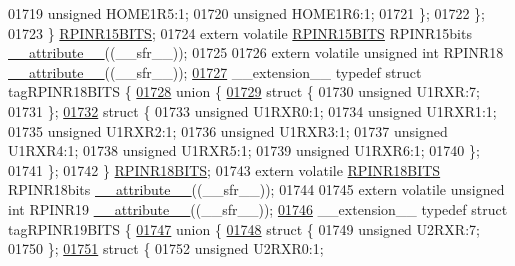 \begin{DoxyCode}
01719       \textcolor{keywordtype}{unsigned} HOME1R5:1;
01720       \textcolor{keywordtype}{unsigned} HOME1R6:1;
01721     \};
01722   \};
01723 \} \hyperlink{a00008_d0/d15/a00700}{RPINR15BITS};
01724 \textcolor{keyword}{extern} \textcolor{keyword}{volatile} \hyperlink{a00008_d0/d15/a00700}{RPINR15BITS} RPINR15bits \hyperlink{a00009_a493c46f03454991ccc5aa7a6e1dfb2a7}{\_\_attribute\_\_}((\_\_sfr\_\_));
01725 
01726 \textcolor{keyword}{extern} \textcolor{keyword}{volatile} \textcolor{keywordtype}{unsigned} \textcolor{keywordtype}{int}  RPINR18 \hyperlink{a00009_a493c46f03454991ccc5aa7a6e1dfb2a7}{\_\_attribute\_\_}((\_\_sfr\_\_));
\hypertarget{a00009_source_l01727}{}\hyperlink{a00008}{01727} \_\_extension\_\_ \textcolor{keyword}{typedef} \textcolor{keyword}{struct }tagRPINR18BITS \{
\hypertarget{a00009_source_l01728}{}\hyperlink{a00009}{01728}   \textcolor{keyword}{union }\{
\hypertarget{a00009_source_l01729}{}\hyperlink{a00009}{01729}     \textcolor{keyword}{struct }\{
01730       \textcolor{keywordtype}{unsigned} U1RXR:7;
01731     \};
\hypertarget{a00009_source_l01732}{}\hyperlink{a00009}{01732}     \textcolor{keyword}{struct }\{
01733       \textcolor{keywordtype}{unsigned} U1RXR0:1;
01734       \textcolor{keywordtype}{unsigned} U1RXR1:1;
01735       \textcolor{keywordtype}{unsigned} U1RXR2:1;
01736       \textcolor{keywordtype}{unsigned} U1RXR3:1;
01737       \textcolor{keywordtype}{unsigned} U1RXR4:1;
01738       \textcolor{keywordtype}{unsigned} U1RXR5:1;
01739       \textcolor{keywordtype}{unsigned} U1RXR6:1;
01740     \};
01741   \};
01742 \} \hyperlink{a00008_d8/d86/a00703}{RPINR18BITS};
01743 \textcolor{keyword}{extern} \textcolor{keyword}{volatile} \hyperlink{a00008_d8/d86/a00703}{RPINR18BITS} RPINR18bits \hyperlink{a00009_a493c46f03454991ccc5aa7a6e1dfb2a7}{\_\_attribute\_\_}((\_\_sfr\_\_));
01744 
01745 \textcolor{keyword}{extern} \textcolor{keyword}{volatile} \textcolor{keywordtype}{unsigned} \textcolor{keywordtype}{int}  RPINR19 \hyperlink{a00009_a493c46f03454991ccc5aa7a6e1dfb2a7}{\_\_attribute\_\_}((\_\_sfr\_\_));
\hypertarget{a00009_source_l01746}{}\hyperlink{a00008}{01746} \_\_extension\_\_ \textcolor{keyword}{typedef} \textcolor{keyword}{struct }tagRPINR19BITS \{
\hypertarget{a00009_source_l01747}{}\hyperlink{a00009}{01747}   \textcolor{keyword}{union }\{
\hypertarget{a00009_source_l01748}{}\hyperlink{a00009}{01748}     \textcolor{keyword}{struct }\{
01749       \textcolor{keywordtype}{unsigned} U2RXR:7;
01750     \};
\hypertarget{a00009_source_l01751}{}\hyperlink{a00009}{01751}     \textcolor{keyword}{struct }\{
01752       \textcolor{keywordtype}{unsigned} U2RXR0:1;

\end{DoxyCode}
